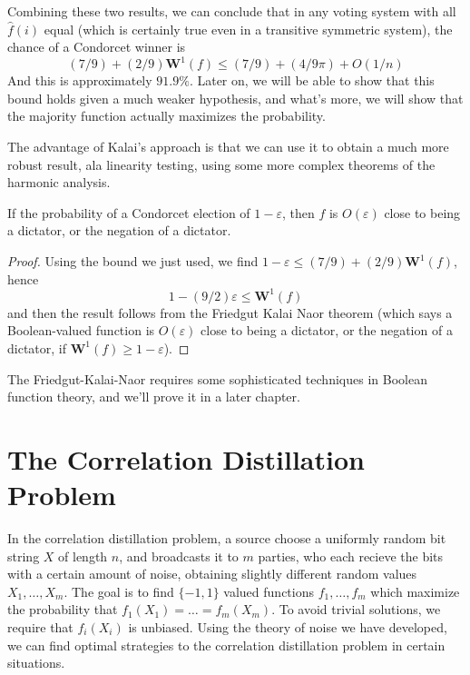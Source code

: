 Combining these two results, we can conclude that in any voting system with all $\widehat{f}(i)$ equal (which is certainly true even in a transitive symmetric system), the chance of a Condorcet winner is
%
\[ (7/9) + (2/9) \mathbf{W}^1(f) \leq (7/9) + (4/9\pi) + O(1/n) \]
%
And this is approximately $91.9\%$. Later on, we will be able to show that this bound holds given a much weaker hypothesis, and what's more, we will show that the majority function actually maximizes the probability.

The advantage of Kalai's approach is that we can use it to obtain a much more robust result, ala linearity testing, using some more complex theorems of the harmonic analysis.

\begin{theorem}
    If the probability of a Condorcet election of $1 - \varepsilon$, then $f$ is $O(\varepsilon)$ close to being a dictator, or the negation of a dictator.
\end{theorem}
\begin{proof}
    Using the bound we just used, we find $1 - \varepsilon \leq (7/9) + (2/9) \mathbf{W}^1(f)$, hence
    \[ 1 - (9/2) \varepsilon \leq \mathbf{W}^1(f) \]
    and then the result follows from the Friedgut Kalai Naor theorem (which says a Boolean-valued function is $O(\varepsilon)$ close to being a dictator, or the negation of a dictator, if $\mathbf{W}^1(f) \geq 1 - \varepsilon$).
\end{proof}

The Friedgut-Kalai-Naor requires some sophisticated techniques in Boolean function theory, and we'll prove it in a later chapter.

\section{The Correlation Distillation Problem}

In the correlation distillation problem, a source choose a uniformly random bit string $X$ of length $n$, and broadcasts it to $m$ parties, who each recieve the bits with a certain amount of noise, obtaining slightly different random values $X_1, \dots, X_m$. The goal is to find $\{ -1, 1 \}$ valued functions $f_1, \dots, f_m$ which maximize the probability that $f_1(X_1) = \dots = f_m(X_m)$. To avoid trivial solutions, we require that $f_i(X_i)$ is unbiased. Using the theory of noise we have developed, we can find optimal strategies to the correlation distillation problem in certain situations.

